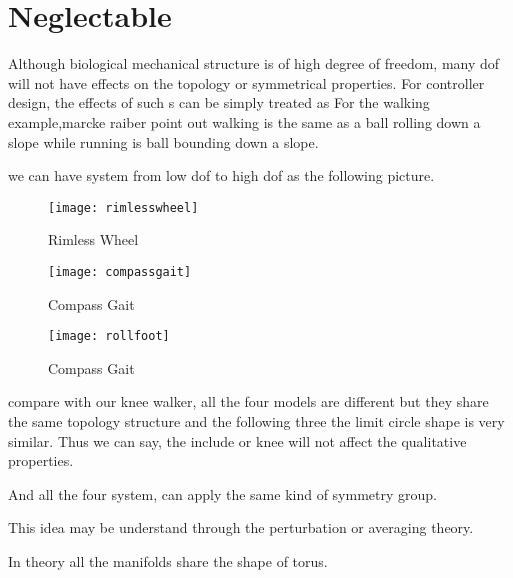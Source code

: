 \section{Neglectable}
Although biological mechanical structure is of high degree of freedom, many dof will not have effects on the topology or symmetrical properties.
For controller design, the effects of such \dof s can be simply treated as
For the walking example,marcke raiber\citet{Raibert1986} point out walking is the same as a ball rolling down a slope while running is ball bounding down a slope.


we can have system from low dof to high dof as the following picture.
\begin{itemize}
\end{itemize}


\begin{figure}[!htbp]
  \begin{center}
    \texttt{[image: rimlesswheel]}
    \caption{Rimless Wheel}
    \label{fig:rimlesswheel}
\end{center}
\end{figure}


\begin{figure}[!htbp]
  \begin{center}
      \texttt{[image: compassgait]}
    \caption{Compass Gait}
    \label{fig:compassgait}
\end{center}
\end{figure}


\begin{figure}[!htbp]
  \begin{center}
      \texttt{[image: rollfoot]}
    \caption{Compass Gait}
    \label{fig:compassgait}
\end{center}
\end{figure}


compare with our knee walker, all the four models are different but they share the same topology structure and the following three the limit circle shape is very similar.
Thus we can say, the include or knee will not affect the qualitative properties.


And all the four system, can apply the same kind of symmetry group.


This idea may be understand through the perturbation or averaging theory.

In theory all the manifolds share the shape of torus.

